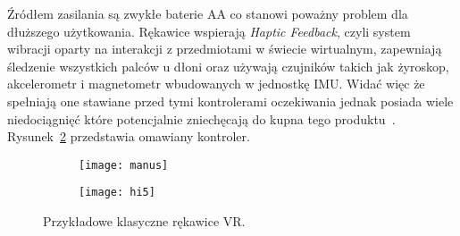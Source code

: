 Źródłem zasilania są zwykłe baterie AA co stanowi poważny problem dla dłuższego użytkowania. Rękawice wspierają \textit{Haptic Feedback}, czyli system wibracji oparty na interakcji z przedmiotami w świecie wirtualnym, zapewniają śledzenie wszystkich palców u dłoni oraz używają czujników takich jak żyroskop, akcelerometr i magnetometr wbudowanych w jednostkę IMU. Widać więc że spełniają one stawiane przed tymi kontrolerami oczekiwania jednak posiada wiele niedociągnięć które potencjalnie zniechęcają do kupna tego produktu~\cite{hi5}. Rysunek~\ref{fig:hi5} przedstawia omawiany kontroler.
\begin{figure}[h]
\centering
	\begin{subfigure}[b]{0.4\textwidth}
	\texttt{[image: manus]}
	\label{fig:manus}
	\end{subfigure}
	\hspace{0.5cm}
	\begin{subfigure}[b]{0.34\textwidth}
	\texttt{[image: hi5]}
	\label{fig:hi5}
	\end{subfigure}
\caption{Przykładowe klasyczne rękawice VR.}
\label{fig:rekawice}
\end{figure}	
